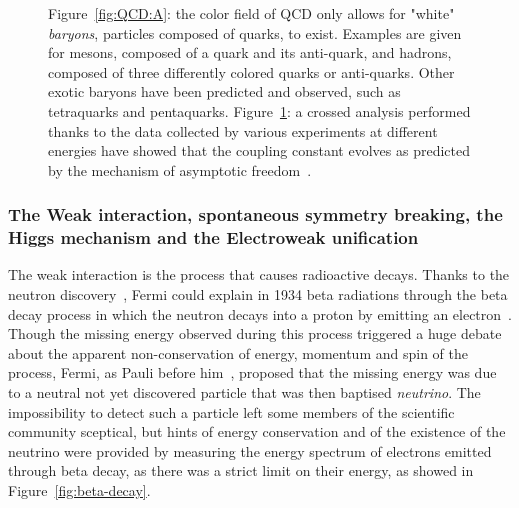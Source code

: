 \begin{figure}[H]
\begin{subfigure}{0.4\linewidth}
			\caption{\label{fig:QCD:B}}
		\end{subfigure}
		\caption{\label{fig:QCD} Figure~\ref{fig:QCD:A}: the color field of QCD only allows for "white" \textit{baryons}, particles composed of quarks, to exist. Examples are given for mesons, composed of a quark and its anti-quark, and hadrons, composed of three differently colored quarks or anti-quarks. Other exotic baryons have been predicted and observed, such as tetraquarks and pentaquarks. Figure~\ref{fig:QCD:B}: a crossed analysis performed thanks to the data collected by various experiments at different energies have showed that the coupling constant evolves as predicted by the mechanism of asymptotic freedom~\cite{BETHKE2003}.}
	\end{figure}
	
	\subsubsection*{The Weak interaction, spontaneous symmetry breaking, the Higgs mechanism and the Electroweak unification}
	\label{chapt2:sssec:HiggsEW}
	
	The weak interaction is the process that causes radioactive decays. Thanks to the neutron discovery~\cite{CHADWICK1932}, Fermi could explain in 1934 beta radiations through the beta decay process in which the neutron decays into a proton by emitting an electron~\cite{FERMI1934}. Though the missing energy observed during this process triggered a huge debate about the apparent non-conservation of energy, momentum and spin of the process, Fermi, as Pauli before him~\cite{PAULI1930}, proposed that the missing energy was due to a neutral not yet discovered particle that was then baptised \textit{neutrino}. The impossibility to detect such a particle left some members of the scientific community sceptical, but hints of energy conservation and of the existence of the neutrino were provided by measuring the energy spectrum of electrons emitted through beta decay, as there was a strict limit on their energy, as showed in Figure~\ref{fig:beta-decay}.
	
\begingroup\setlength{\intextsep}{5pt}\setlength{\columnsep}{15pt}
	
